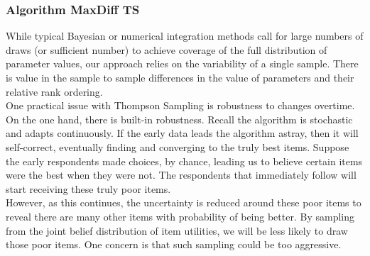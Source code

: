 \documentclass[nonblindrev]{informs3}
\begin{document}
\subsubsection{Algorithm MaxDiff TS}
While typical Bayesian or numerical integration methods call for large numbers of draws (or sufficient number) to achieve coverage of the full distribution of parameter values, our  approach relies on the variability of a single sample. There is value in the sample to sample differences in the value of parameters and their relative rank ordering.  \\
One practical issue with Thompson Sampling is robustness to changes overtime. On the one hand, there is built-in robustness. Recall the algorithm is stochastic and adapts continuously. If the early data leads the algorithm astray, then it will self-correct, eventually finding and converging to the truly best items. Suppose the early respondents made choices, by chance, leading us to believe certain items were the best when they were not. The respondents that immediately follow will start receiving these truly poor items. \\
However, as this continues, the uncertainty is reduced around these poor items to reveal there are many other items with probability of being better. By sampling from the joint belief distribution of item utilities, we will be less likely to draw those poor items. One concern is that such sampling could be too aggressive.\\
\end{document}
